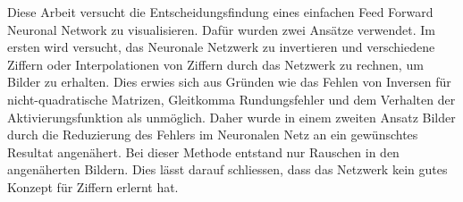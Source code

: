 \documentclass[Interploate_hadwritten_Digits.tex]{subfiles}
\begin{document}
	Diese Arbeit versucht die Entscheidungsfindung eines einfachen Feed Forward Neuronal Network zu visualisieren. Dafür wurden zwei Ansätze verwendet. Im ersten wird versucht, das Neuronale Netzwerk zu invertieren und verschiedene Ziffern oder Interpolationen von Ziffern durch das Netzwerk zu rechnen, um Bilder zu erhalten. Dies erwies sich aus Gründen wie das Fehlen von Inversen für nicht-quadratische Matrizen, Gleitkomma Rundungsfehler und dem Verhalten der Aktivierungsfunktion als unmöglich. Daher wurde in einem zweiten Ansatz Bilder durch die Reduzierung des Fehlers im Neuronalen Netz an ein gewünschtes Resultat angenähert. Bei dieser Methode entstand nur Rauschen in den angenäherten Bildern. Dies lässt darauf schliessen, dass das Netzwerk kein gutes Konzept für Ziffern erlernt hat.
\end{document}

